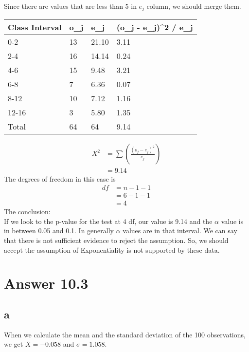 \documentclass[11pt]{article}
\begin{document}
Since there are values that are less than 5 in $e_j$ column, we should merge them. \\

\begin{table}[H]
\centering
\begin{tabular}{|l|l|l|l|}
\hline
Class Interval & o\_j & e\_j  & (o\_j - e\_j)\textasciicircum{}2 / e\_j \\ \hline
0-2            & 13   & 21.10 & 3.11                                    \\ \hline
2-4            & 16   & 14.14 & 0.24                                    \\ \hline
4-6            & 15   & 9.48  & 3.21                                    \\ \hline
6-8            & 7    & 6.36  & 0.07                                    \\ \hline
8-12           & 10    & 7.12  & 1.16                                    \\ \hline
12-16          & 3    & 5.80  & 1.35                                    \\ \hline
Total          & 64   & 64   & 9.14                                   \\ \hline
\end{tabular}
\end{table}

\begin{align*}
X^2 &= \sum (\frac{(o_j - e_ j)^2}{e_j}) \\
&= 9.14
\end{align*}
The degrees of freedom in this case is\\
\begin{align*}
df &= n-1 - 1\\
&=6 - 1 - 1\\
&=4
\end{align*}
The conclusion:\\
If we look to the p-value for the test at 4 df, our value is 9.14 and the $\alpha$ value is in between 0.05 and 0.1. In generally $\alpha$ values are in that interval. We can say that there is not sufficient evidence to reject the assumption. So, we should accept the assumption of Exponentiality is not supported by these data.

\section*{Answer 10.3}
\subsection*{a}
When we calculate the mean and the standard deviation of the 100 observations, we get $\bar{X} = -0.058$ and $\sigma = 1.058$.\\
\end{document}

